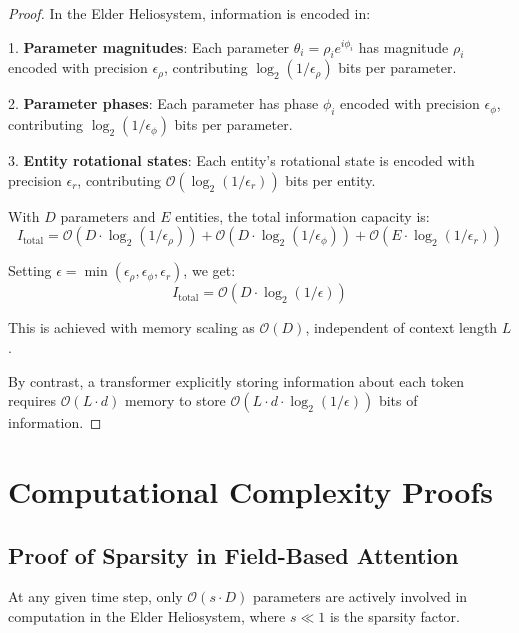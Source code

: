 \begin{proof}
In the Elder Heliosystem, information is encoded in:

1. \textbf{Parameter magnitudes}: Each parameter $\theta_i = \rho_i e^{i\phi_i}$ has magnitude $\rho_i$ encoded with precision $\epsilon_\rho$, contributing $\log_2(1/\epsilon_\rho)$ bits per parameter.

2. \textbf{Parameter phases}: Each parameter has phase $\phi_i$ encoded with precision $\epsilon_\phi$, contributing $\log_2(1/\epsilon_\phi)$ bits per parameter.

3. \textbf{Entity rotational states}: Each entity's rotational state is encoded with precision $\epsilon_r$, contributing $\mathcal{O}(\log_2(1/\epsilon_r))$ bits per entity.

With $D$ parameters and $E$ entities, the total information capacity is:
\begin{equation}
I_{\text{total}} = \mathcal{O}(D \cdot \log_2(1/\epsilon_\rho)) + \mathcal{O}(D \cdot \log_2(1/\epsilon_\phi)) + \mathcal{O}(E \cdot \log_2(1/\epsilon_r))
\end{equation}

Setting $\epsilon = \min(\epsilon_\rho, \epsilon_\phi, \epsilon_r)$, we get:
\begin{equation}
I_{\text{total}} = \mathcal{O}(D \cdot \log_2(1/\epsilon))
\end{equation}

This is achieved with memory scaling as $\mathcal{O}(D)$, independent of context length $L$.

By contrast, a transformer explicitly storing information about each token requires $\mathcal{O}(L \cdot d)$ memory to store $\mathcal{O}(L \cdot d \cdot \log_2(1/\epsilon))$ bits of information.
\end{proof}

\section{Computational Complexity Proofs}

\subsection{Proof of Sparsity in Field-Based Attention}

\begin{theorem}
At any given time step, only $\mathcal{O}(s \cdot D)$ parameters are actively involved in computation in the Elder Heliosystem, where $s \ll 1$ is the sparsity factor.
\end{theorem}

